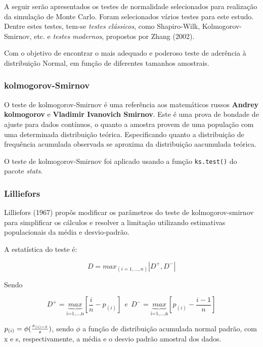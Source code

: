 \documentclass[a4paper,11pt]{article} %
\begin{document}
A seguir serão apresentados os testes de normalidade selecionados para realização da simulação de Monte Carlo. Foram selecionados vários testes para este estudo. Dentre estes testes, tem-se \textit{testes clássicos}, como Shapiro-Wilk, Kolmogorov-Smirnov, etc. e \textit{testes modernos}, propostos por Zhang (2002).\vskip0.3cm

Com o objetivo de encontrar o mais adequado e poderoso teste de aderência à distribuição Normal, em função de diferentes tamanhos amostrais.

\subsubsection{kolmogorov-Smirnov}

O teste de kolmogorov-Smirnov é uma referência aos matemáticos russos \textbf{Andrey kolmogorov} e \textbf{Vladimir Ivanovich Smirnov}. Este é uma prova de bondade de ajuste para dados contínuos, o quanto a amostra provem de uma população com uma determinada distribuição teórica. Especificando quanto a distribuição de frequência acumulada observada se aproxima da distribuição aacumulada teórica.\vskip0.3cm

O teste de kolmogorov-Smirnov foi aplicado usando a função \texttt{ks.test()} do pacote \textit{stats}. \vskip0.3cm

\subsubsection{Lilliefors}

Lilliefors (1967) propôs modificar os parâmetros do teste de kolmogorov-smirnov para simplificar os cálculos e resolver a limitação utilizando estimativas populacionais da média e desvio-padrão.\vskip0.3cm

A estatística do teste é:

\begin{equation}
   D = max_{(i=1,...,n)}|D^{+},D^{-}|
\end{equation}

Sendo

\begin{equation}
    D^{+} =   \underbrace{max}_{\mbox{i=1,...,n}}    {\left[\frac{i}{n} - p_{(i)}\right]} \ \ e \ \ D^{-} = \underbrace{max}_{\mbox{i=1,...,n}}  {\left[p_{(i)} - \frac{i-1}{n}\right]}
\end{equation}

$ p_{(i)}= \phi( \frac{x_{(i)-\Bar{x}}}{s} )$, sendo $\phi$ a função de distribuição acumulada normal padrão, com x e s, respectivamente, a média e o desvio padrão amostral dos dados.\vskip0.3cm
\end{document}
